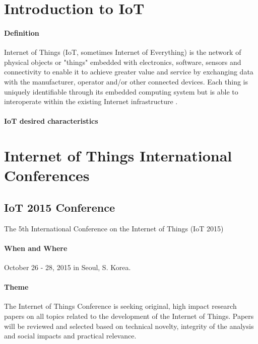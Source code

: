 \documentclass[12pt]{article}
\begin{document}
\maketitle

\section {Introduction to IoT}
\paragraph {Definition} Internet of Things (IoT, sometimes Internet of Everything) is the network of physical objects or "things" embedded with electronics, software, sensors and connectivity to enable it to achieve greater value and service by exchanging data with the manufacturer, operator and/or other connected devices. Each thing is uniquely identifiable through its embedded computing system but is able to interoperate within the existing Internet infrastructure \cite {wiki}.
\paragraph {IoT desired characteristics}


\section{Internet of Things International Conferences}


\subsection {IoT 2015 Conference}
The 5th International Conference on the Internet of Things (IoT 2015) 


\paragraph{When and Where} October 26 - 28, 2015 in Seoul, S. Korea.

 \paragraph{Theme}The Internet of Things Conference is seeking original, high impact research papers on all topics related to the development of the Internet of Things. Papers will be reviewed and selected based on technical novelty, integrity of the analysis and social impacts and practical relevance.
\end{document}
